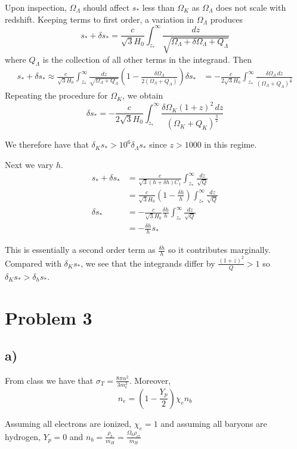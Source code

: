 \documentclass{article}
\begin{document}
Upon inspection, $\Omega_\Lambda$ should affect $s_*$ less than $\Omega_K$ as $\Omega_\Lambda$ does not scale with redshift. Keeping terms to first order, a variation in $\Omega_\Lambda$ produces
\[s_*+\delta s_*= \frac{c}{\sqrt{3}H_0}\int_{z_*}^\infty \frac{dz}{\sqrt{\Omega_\Lambda + \delta\Omega_\Lambda + Q_\Lambda}}\]
where $Q_\Lambda$ is the collection of all other terms in the integrand. Then
\begin{align*}
s_* + \delta s_* \approx \frac{c}{\sqrt{3}H_0}\int_{z_*}^\infty \frac{dz}{\sqrt{\Omega_\Lambda + Q_\Lambda}}\left(1-\frac{\delta\Omega_\Lambda}{2(\Omega_\Lambda + Q_\Lambda)}\right)
\delta s_* &= -\frac{c}{2\sqrt{3} H_0}\int_{z_*}^\infty \frac{\delta \Omega_\Lambda\,dz}{(\Omega_\Lambda + Q_\Lambda)^{\frac{3}{2}}}
\end{align*}
Repeating the procedure for $\Omega_K$, we obtain
\[\delta s_* = -\frac{c}{2\sqrt{3}H_0}\int_{z_*}^{\infty}\frac{\delta\Omega_K(1+z)^2\,dz}{(\Omega_K+Q_K)^{\frac{3}{2}}}\]

We therefore have that $\delta_K s_* > 10^6 \delta_\Lambda s_*$ since $z>1000$ in this regime.

Next we vary $h$.
\begin{align*}
s_*+\delta s_* &= \frac{c}{\sqrt{3}(h+\delta h)C_1}\int_{z_*}^\infty \frac{dz}{\sqrt{Q}}\\
&= \frac{c}{\sqrt{3}H_0}\left(1-\frac{\delta h}{h}\right)\int_{z_*}^\infty\frac{dz}{\sqrt{Q}}\\
\delta s_* &= -\frac{c}{\sqrt{3}H_0}\frac{\delta h}{h}\int_{z_*}^\infty \frac{dz}{\sqrt{Q}}\\
&= -\frac{\delta h}{h}s_*
\end{align*}

This is essentially a second order term as $\frac{\delta h}{h}$ so it contributes marginally. Compared with $\delta_K s_*$, we see that the integrands differ by $\frac{(1+z)^2}{Q}>1$ so $\delta_K s_* > \delta_h s_*$.

\section*{Problem 3}
\subsection*{a)}
From class we have that $\sigma_T = \frac{8\pi \alpha^2}{3m_e^2}$. Moreover,
\[n_e = \left(1-\frac{Y_p}{2}\right)\chi_e n_b\]

Assuming all electrons are ionized, $\chi_e=1$ and assuming all baryons are hydrogen, $Y_p=0$ and $n_b = \frac{\rho_b}{m_H} = \frac{\Omega_b \rho_{cr}}{m_H}$
\end{document}
